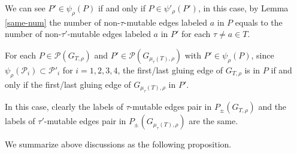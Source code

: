 \documentclass[10pt]{amsart}
\theoremstyle{theorems}
\begin{document}
We can see $P'\in \psi_{\rho}(P)$ if and only if $P\in \psi'_{\rho}(P')$, in this case, by Lemma \ref{same-num} the number of non-$\tau$-mutable edges labeled $a$ in $P$ equals to the number of non-$\tau'$-mutable edges labeled $a$ in $P'$ for each $\tau\neq a\in T$.

\medskip

For each $P\in \mathcal P(G_{T,\rho})$ and $P'\in \mathcal P(G_{\mu_{\tau}(T),\rho})$ with $P'\in \psi_{\rho}(P)$, since $\psi_{\rho}(\mathcal P_i)\subset \mathcal P'_i$ for $i=1,2,3,4$, the first/last gluing edge of $G_{T,\rho}$ is in $P$ if and only if the first/last gluing edge of $G_{\mu_{\tau}(T),\rho}$ in $P'$.

\medskip

In this case, clearly the labels of $\tau$-mutable edges pair in $P_{\pm}(G_{T,\rho})$ and the labels of $\tau'$-mutable edges pair in $P_{\pm}(G_{\mu_{\tau}(T),\rho})$ are the same.

\medskip

We summarize above discussions as the following proposition.
\end{document}
